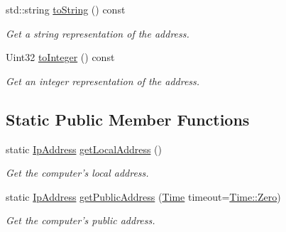 \begin{DoxyCompactItemize}
std\+::string \hyperlink{classsf_1_1_ip_address_a52f4be92fb0ceb689abc469e4a85fd82}{to\+String} () const 
\begin{DoxyCompactList}\small\item\em Get a string representation of the address. \end{DoxyCompactList}\item 
Uint32 \hyperlink{classsf_1_1_ip_address_af42678b08b23def2560aed7d98b24d89}{to\+Integer} () const 
\begin{DoxyCompactList}\small\item\em Get an integer representation of the address. \end{DoxyCompactList}\end{DoxyCompactItemize}
\subsection*{Static Public Member Functions}
\begin{DoxyCompactItemize}
\item 
static \hyperlink{classsf_1_1_ip_address}{Ip\+Address} \hyperlink{classsf_1_1_ip_address_a4c31622ad87edca48adbb8e8ed00ee4a}{get\+Local\+Address} ()
\begin{DoxyCompactList}\small\item\em Get the computer's local address. \end{DoxyCompactList}\item 
static \hyperlink{classsf_1_1_ip_address}{Ip\+Address} \hyperlink{classsf_1_1_ip_address_a5c5cbf67e4aacf23c24f2ad991df4c55}{get\+Public\+Address} (\hyperlink{classsf_1_1_time}{Time} timeout=\hyperlink{classsf_1_1_time_a8db127b632fa8da21550e7282af11fa0}{Time\+::\+Zero})
\begin{DoxyCompactList}\small\item\em Get the computer's public address. \end{DoxyCompactList}\end{DoxyCompactItemize}
